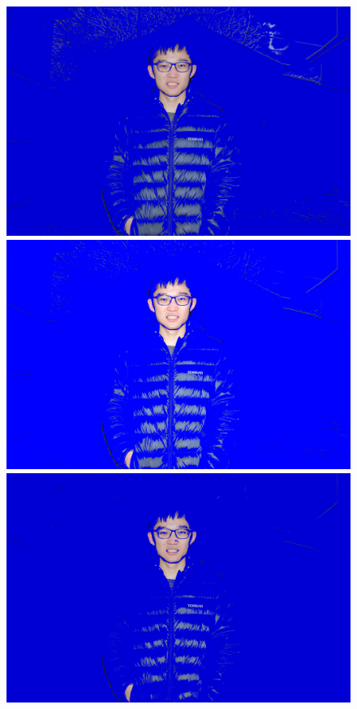 \documentclass[final]{cvpr}
\begin{document}
\begin{figure}[ht]
   \centering
   \includegraphics[scale=0.03]{../data/output/arthas_final_f_1.2_0.07_10_10.JPG}
   \includegraphics[scale=0.03]{../data/output/arthas_final_f_1.2_0.10_10_10.JPG}
   \includegraphics[scale=0.03]{../data/output/arthas_final_f_1.2_0.15_10_10.JPG}

\end{figure}
\end{document}
